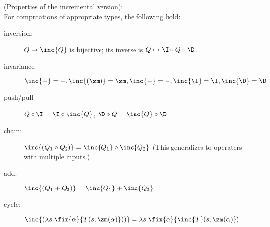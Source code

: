 \begin{proposition}(Properties of the incremental version):\\
\label{prop-inc-properties}
For computations of appropriate types, the following hold:
\begin{description}
\item[inversion:] $Q\mapsto\inc{Q}$ is bijective; its inverse is $Q\mapsto \I\circ Q\circ\D$.
\item[invariance:] $\inc{+} = +, \inc{(\zm)} = \zm, \inc{-} = -, \inc{\I}=\I, \inc{\D}=\D$
\item[push/pull:]
    $Q \circ \I = \I \circ \inc{Q}$; $\D\circ Q = \inc{Q}\circ\D$
\item[chain:] $\inc{(Q_1\circ Q_2)} = \inc{Q_1}\circ\inc{Q_2}$ (This generalizes to operators with multiple inputs.)
\item[add:] $\inc{(Q_1 + Q_2)} = \inc{Q_1} + \inc{Q_2}$
\item[cycle:] $\inc{(\lambda s. \fix{\alpha}{T(s,\zm(\alpha)}))} = \lambda s. \fix{\alpha}{\inc{T}(s,\zm(\alpha)})$
\end{description}
\end{proposition}
